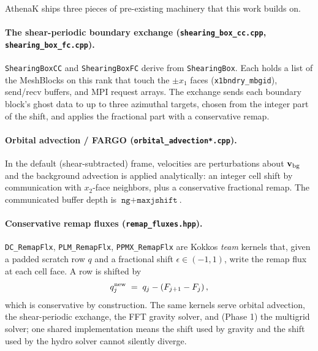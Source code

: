 \documentclass[11pt]{article}
\newcommand{\code}[1]{\texttt{#1}}
\newcommand{\file}[1]{\texttt{\small #1}}
\newcommand{\fn}[1]{\texttt{\small #1}}
\begin{document}
AthenaK ships three pieces of pre-existing machinery that this work builds on.

\paragraph{The shear-periodic boundary exchange
(\file{shearing\_box\_cc.cpp}, \file{shearing\_box\_fc.cpp}).}
\code{ShearingBoxCC} and \code{ShearingBoxFC} derive from \code{ShearingBox}. Each
holds a list of the MeshBlocks on this rank that touch the $\pm x_1$ faces
(\code{x1bndry\_mbgid}), send/recv buffers, and MPI request arrays. The exchange
sends each boundary block's ghost data to up to three azimuthal targets, chosen from
the integer part of the shift, and applies the fractional part with a conservative
remap.

\paragraph{Orbital advection / FARGO (\file{orbital\_advection*.cpp}).}
In the default (shear-subtracted) frame, velocities are perturbations about
$\mathbf{v}_{\rm bg}$ and the background advection is applied analytically: an integer
cell shift by communication with $x_2$-face neighbors, plus a conservative fractional
remap. The communicated buffer depth is $\code{ng} + \code{maxjshift}$.

\paragraph{Conservative remap fluxes (\file{remap\_fluxes.hpp}).}
\fn{DC\_RemapFlx}, \fn{PLM\_RemapFlx}, \fn{PPMX\_RemapFlx} are Kokkos \emph{team}
kernels that, given a padded scratch row $q$ and a fractional shift
$\epsilon \in (-1,1)$, write the remap flux at each cell face. A row is shifted by
\begin{equation}
  q^{\rm new}_j \;=\; q_j - \left( F_{j+1} - F_j \right),
  \label{eq:remap}
\end{equation}
which is conservative by construction. The same kernels serve orbital advection, the
shear-periodic exchange, the FFT gravity solver, and (Phase 1) the multigrid solver;
one shared implementation means the shift used by gravity and the shift used by the
hydro solver cannot silently diverge.
\end{document}
